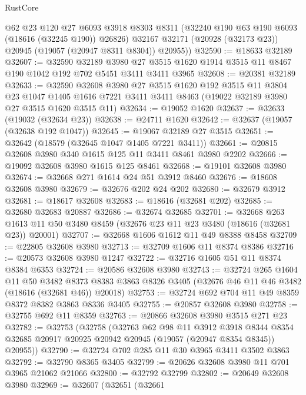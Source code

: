 \begin{lexlean}{RustCore}
\begin{coremodule}
        @62
        @23
        @120
        @27
        @6093
        @3918
        @8303
        @8311
        (@32240 @190 @63 @190 @6093 (@18616 (@32245 @190)) @26826)
        @32167
        @32171
        (@20928 (@32173 @23))
        @20945
        (@19057 (@20947 @8311 @8304))
        @20955))
@32590 := @18633 @32189
@32607 := @32590
    @32189
    @3980
    @27
    @3515
    @1620
    @1914
    @3515
    @11
    @8467
    @190
    @1042
    @192
    @702
    @5451
    @3411
    @3411
    @3965
@32608 := @20381 @32189
@32633 := @32590
    @32608
    @3980
    @27
    @3515
    @1620
    @192
    @3515
    @11
    @3804
    @23
    @1047
    @1405
    @1616
    @7221
    @3411
    @3411
    @8463
    (@19022 @32189 @3980 @27 @3515 @1620 @3515 @11)
@32634 := @19052 @1620
@32637 := @32633 (@19032 (@32634 @23))
@32638 := @24711 @1620
@32642 := @32637 (@19057 (@32638 @192 @1047))
@32645 := @19067 @32189 @27 @3515
@32651 := @32642 (@18579 (@32645 @1047 @1405 @7221 @3411))
@32661 := @20815 @32608 @3980 @340 @1615 @125 @11 @3411 @8461 @3980 @2202
@32666 := @19092 @32608 @3980 @1615 @125 @8461
@32668 := @19101 @32608 @3980
@32674 := @32668 @271 @1614 @24 @51 @3912 @8460
@32676 := @18608 @32608 @3980
@32679 := @32676 @202 @24 @202
@32680 := @32679 @3912
@32681 := @18617 @32608
@32683 := @18616 (@32681 @202)
@32685 := @32680 @32683 @20887
@32686 := @32674 @32685
@32701 := @32668
    @263
    @1613
    @11
    @50
    @3480
    @8459
    (@32676 @23 @11 @23 @3480 (@18616 (@32681 @23)) @20001)
@32707 := @32668 @1606 @1612 @11 @49 @8388 @8458
@32709 := @22805 @32608 @3980
@32713 := @32709 @1606 @11 @8374 @8386
@32716 := @20573 @32608 @3980 @1247
@32722 := @32716 @1605 @51 @11 @8374 @8384 @6353
@32724 := @20586 @32608 @3980
@32743 := @32724
    @265
    @1604
    @11
    @50
    @3482
    @8373
    @8383
    @3863
    @8326
    @3405
    (@32676 @46 @11 @46 @3482 (@18616 (@32681 @46)) @20018)
@32753 := @32724 @692 @704 @11 @49 @8359 @8372 @8382 @3863 @8336 @3405
@32755 := @20857 @32608 @3980
@32758 := @32755 @692 @11 @8359
@32763 := @20866 @32608 @3980 @3515 @271 @23
@32782 := @32753
    (@32758
      (@32763
        @62
        @98
        @11
        @3912
        @3918
        @8344
        @8354
        @32685
        @20917
        @20925
        @20942
        @20945
        (@19057 (@20947 @8354 @8345))
        @20955))
@32790 := @32724 @702 @285 @11 @30 @3965 @3411 @3502 @3863
@32792 := @32790 @8365 @3405
@32799 := @20626 @32608 @3980 @11 @701 @3965 @21062 @21066
@32800 := @32792 @32799
@32802 := @20649 @32608 @3980
@32969 := @32607
    (@32651
      (@32661

\end{coremodule}
\end{lexlean}
